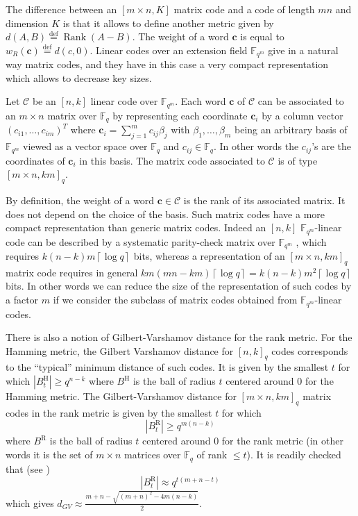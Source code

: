 \documentclass[11pt, a4paper]{llncs}
\newcommand{\eqdef}{\stackrel{\text{def}}{=}}
\newcommand{\Ceil}[1]{\left\lceil #1 \right\rceil}
\newcommand{\Fq}{\mathbb{F}_q}
\newcommand{\Fqm}{\mathbb{F}_{q^m}}
\newcommand{\C}{\mathcal{C}}
\newcommand{\word}[1]{\ensuremath{\boldsymbol{#1}}}
\newcommand{\cv}{\word{c}}
\DeclareMathOperator{\Rank}{Rank}
\begin{document}
The difference between an $[m \times n, K]$ matrix code and a code of length $mn$ and  dimension $K$ is that it allows 
to define another metric given by $d(A, B) \eqdef \Rank(A - B)$. The weight of a word $\cv$ is equal to $w_R(\cv) \eqdef d(c, 0)$. 
Linear codes over an extension field $\Fqm$ give in a natural way matrix codes, and they have in this case a very compact
representation which allows to decrease key sizes.

\begin{definition}[matrix code associated to an $\Fqm$-linear code]\label{def_linear_code}
Let $\C$ be an $[n, k]$ linear code over $\Fqm$. Each word $\cv$ of $\C$ can be associated to an $m \times n$ matrix over $\Fq$ by representing
each coordinate $\cv_i$ by a column vector $(c_{i1},\dots,c_{im})^T$ where $\cv_i = \sum_{j=1}^m c_{ij} \beta_j$ 
with $\beta_1,\dots,\beta_m$ being an arbitrary basis of  $\Fqm$ viewed as a vector space over $\Fq$ and
$c_{ij} \in \Fq$. In other words the $c_{ij}$'s are the coordinates of $\cv_i$ in this basis. The matrix code associated to $\C$ is of type $[m \times n, km]_q$.
\end{definition}


By definition, the weight of a word $\cv \in \C$ is the rank of its associated matrix. It does not depend on the choice of the basis. 
Such matrix codes have a more compact representation than generic matrix codes. Indeed an $[n, k]$ $\Fqm$-linear code can be described by a systematic parity-check matrix over $\Fqm$ , which requires $k(n-k)m \Ceil{\log q}$ bits, whereas a representation of an $[m\times n, km]_q$ matrix code requires in general $km(mn-km) \Ceil{\log q} =
k(n - k)m^2 \Ceil{\log q}$ bits. In other words we  can reduce the size of the representation of such codes by a factor $m$ if we
consider the subclass of matrix codes obtained from $\Fqm$-linear codes.

There is also a notion of Gilbert-Varshamov distance for the rank metric. 
For the Hamming metric, the Gilbert Varshamov distance for $[n,k]_q$ codes corresponds to 
the ``typical'' minimum distance of such codes. It is given by the smallest $t$ for which 
$|B^{\text{H}}_t| \geq q^{n-k}$ where $B^{\text{H}}$ is the  ball of
radius $t$ centered around $0$ for the Hamming metric. The Gilbert-Varshamov distance for $[m \times n,km]_q$ matrix codes in the rank metric is given by the smallest 
$t$ for which 
$$
|B^{\text{R}}_t| \geq q^{m(n-k)}
$$
where 
$B^{\text{R}}$ is the  ball of
radius $t$ centered around $0$  for the rank  metric (in other words it is the set of $m \times n$ matrices
over $\Fq$ of rank $\leq t$).
It is readily checked that (see \cite{LN97})
$$
|B^{\text{R}}_t| \approx q^{t(m+n-t)}
$$
which gives  $d_{GV} \approx \frac{m+n-\sqrt{(m+n)^2-4m(n-k)}}{2}$.
 
\end{document}

